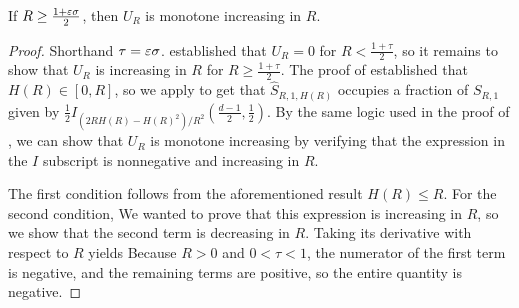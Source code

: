 \begin{lemma}
\label{lem:U_R_monotonic}
    If $R \geq \frac{1+\varepsilon \sigma}{2}$, then $U_R$ is monotone increasing in $R$.
\end{lemma}
\begin{proof}
    Shorthand $\tau = \varepsilon \sigma$.  established that $U_R = 0$ for $R < \frac{1+\tau}{2}$, so it remains to show that $U_R$ is increasing in $R$ for $R \geq \frac{1+\tau}{2}$. The proof of  established that $H(R) \in [0,R]$, so we apply  to get that $\hat S_{R, 1, H(R)}$ occupies a fraction of $S_{R,1}$ given by $\frac{1}{2}I_{(2RH(R) - H(R)^2)/R^2}\left(\frac{d-1}{2}, \frac{1}{2}\right)$. By the same logic used in the proof of , we can show that $U_{R}$ is monotone increasing by verifying that the expression in the $I$ subscript is nonnegative and increasing in $R$.
    
    The first condition follows from the aforementioned result $H(R) \leq R$. For the second condition,
    We wanted to prove that this expression is increasing in $R$, so we show that the second term is decreasing in $R$. Taking its derivative with respect to $R$ yields
    Because $R > 0$ and $0 < \tau < 1$, the numerator of the first term is negative, and the remaining terms are positive, so the entire quantity is negative.
\end{proof}

